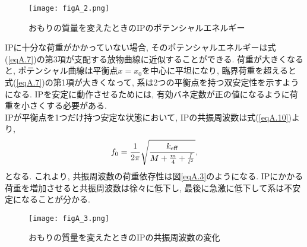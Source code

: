 \begin{figure}[H]
\begin{center}
\texttt{[image: figA\_2.png]} 
\caption[おもりの質量を変えたときのIPのポテンシャルエネルギー]{おもりの質量を変えたときのIPのポテンシャルエネルギー}
\label{figA.2}
\end{center}
\end{figure}
IPに十分な荷重がかかっていない場合, そのポテンシャルエネルギーは式(\ref{eqA.7})の第3項が支配する放物曲線に近似することができる. 荷重が大きくなると, ポテンシャル曲線は平衡点$x=x_0$を中心に平坦になり, 臨界荷重を超えると式(\ref{eqA.7})の第1項が大きくなって, 系は2つの平衡点を持つ双安定性を示すようになる. IPを安定に動作させるためには, 有効バネ定数が正の値になるように荷重を小さくする必要がある. \\
\quad IPが平衡点を1つだけ持つ安定な状態において, IPの共振周波数は式(\ref{eqA.10})より, 
\begin{equation}
f_0=\frac{1}{2\pi}\sqrt{\frac{k_{\rm eff}}{M+\frac{m}{4}+\frac{I}{l^2}}},
\end{equation}
となる. これより, 共振周波数の荷重依存性は図\ref{eqA.3}のようになる. IPにかかる荷重を増加させると共振周波数は徐々に低下し, 最後に急激に低下して系は不安定になることが分かる. 
\begin{figure}[H]
\begin{center}
\texttt{[image: figA\_3.png]} 
\caption[おもりの質量を変えたときのIPの共振周波数の変化]{おもりの質量を変えたときのIPの共振周波数の変化}
\label{figA.3}
\end{center}
\end{figure}
